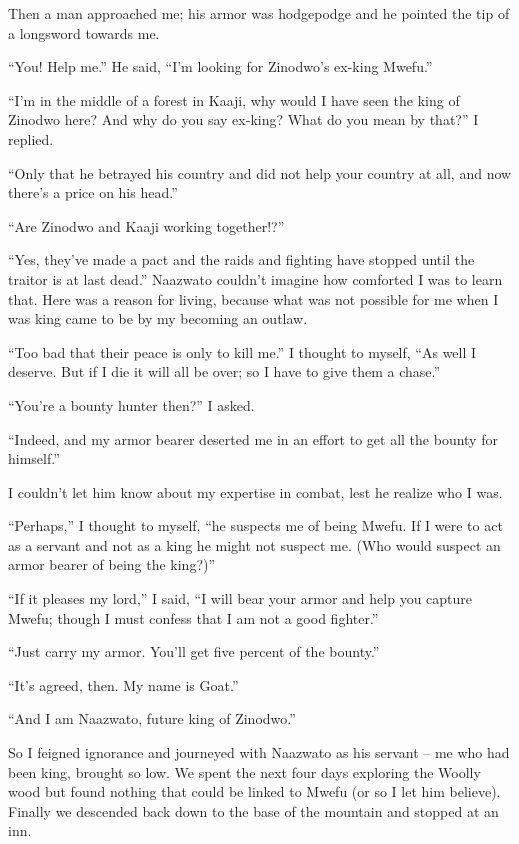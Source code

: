 Then a man approached me; his armor was hodgepodge and he pointed the tip of a longsword towards me.

``You! Help me.'' He said, ``I'm looking for Zinodwo's ex-king Mwefu.''

``I'm in the middle of a forest in Kaaji, why would I have seen the king of Zinodwo here? And why do you say ex-king? What do you mean by that?'' I replied.

``Only that he betrayed his country and did not help your country at all, and now there's a price on his head.''

``Are Zinodwo and Kaaji working together!?''

``Yes, they've made a pact and the raids and fighting have stopped until the traitor is at last dead.'' Naazwato couldn't imagine how comforted I was to learn that. Here was a reason for living, because what was not possible for me when I was king came to be by my becoming an outlaw. 

``Too bad that their peace is only to kill me.'' I thought to myself, ``As well I deserve. But if I die it will all be over; so I have to give them a chase.''

``You're a bounty hunter then?'' I asked.

``Indeed, and my armor bearer deserted me in an effort to get all the bounty for himself.'' 

I couldn't let him know about my expertise in combat, lest he realize who I was.

``Perhaps,'' I thought to myself, ``he suspects me of being Mwefu. If I were to act as a servant and not as a king he might not suspect me. (Who would suspect an armor bearer of being the king?)''

``If it pleases my lord,'' I said, ``I will bear your armor and help you capture Mwefu; though I must confess that I am not a good fighter.''

``Just carry my armor. You'll get five percent of the bounty.''

``It's agreed, then. My name is Goat.''

``And I am Naazwato, future king of Zinodwo.''

So I feigned ignorance and journeyed with Naazwato as his servant -- me who had been king, brought so low. We spent the next four days exploring the Woolly wood but found nothing that could be linked to Mwefu (or so I let him believe). Finally we descended back down to the base of the mountain and stopped at an inn.

